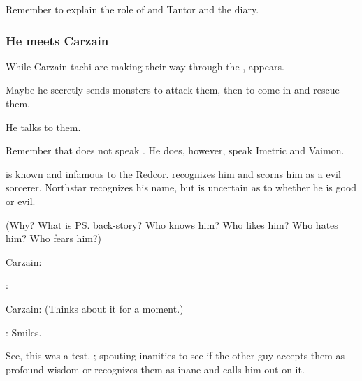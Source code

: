 Remember to explain the role of \Ambrose \Onatol and \Jirad Tantor and the diary. 





\subsubsection{He meets Carzain}
While Carzain-tachi are making their way through the \Wylde{}, \Ishnaruchaefir{} appears. 

Maybe he secretly sends monsters to attack them, then to come in and rescue them. 

He talks to them.

Remember that \Ishnaruchaefir{} does not speak \Velcadian. 
He does, however, speak Imetric and Vaimon. 

\Ishnaruchaefir{} is known and infamous to the Redcor. 
\Esmerel{} recognizes him and scorns him as a evil sorcerer. 
Northstar recognizes his name, but is uncertain as to whether he is good or evil. 

(Why? 
What is \ps{\Ishnaruchaefir} back-story? 
Who knows him? 
Who likes him? 
Who hates him? 
Who fears him?)


Carzain: 

\Ishnaruchaefir{}: 

Carzain: (Thinks about it for a moment.) 

\Ishnaruchaefir:  Smiles. 

See, this was a test. 
\Ishnaruchaefir{} ; spouting inanities to see if the other guy accepts them as profound wisdom or recognizes them as inane and calls him out on it. 


